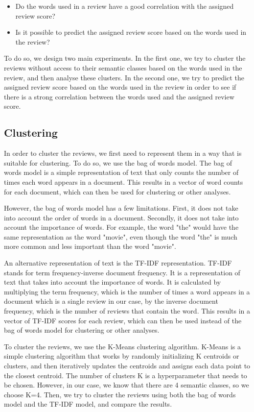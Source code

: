 \documentclass[12pt]{article}    %
\begin{document}
\begin{itemize}
    \item Do the words used in a review have a good correlation with the assigned review score?
    \item Is it possible to predict the assigned review score based on the words used in the review?
\end{itemize}

To do so, we design two main experiments. In the first one, we try to cluster the reviews without access to their semantic classes based on the words used in the review, and then analyse these clusters. In the second one, we try to predict the assigned review score based on the words used in the review in order to see if there is a strong correlation between the words used and the assigned review score.

\subsection{Clustering}

In order to cluster the reviews, we first need to represent them in a way that is suitable for clustering. To do so, we use the bag of words model. The bag of words model is a simple representation of text that only counts the number of times each word appears in a document. This results in a vector of word counts for each document, which can then be used for clustering or other analyses.

However, the bag of words model has a few limitations. First, it does not take into account the order of words in a document. Secondly, it does not take into account the importance of words. For example, the word "the" would have the same representation as the word "movie", even though the word "the" is much more common and less important than the word "movie". 

An alternative representation of text is the TF-IDF representation. TF-IDF stands for term frequency-inverse document frequency. It is a representation of text that takes into account the importance of words. It is calculated by multiplying the term frequency, which is the number of times a word appears in a document which is a single review in our case, by the inverse document frequency, which is the number of reviews that contain the word. This results in a vector of TF-IDF scores for each review, which can then be used instead of the bag of words model for clustering or other analyses.


To cluster the reviews, we use the K-Means clustering algorithm. K-Means is a simple clustering algorithm that works by randomly initializing K centroids or clusters, and then iteratively updates the centroids and assigns each data point to the closest centroid. The number of clusters K is a hyperparameter that needs to be chosen. However, in our case, we know that there are 4 semantic classes, so we choose K=4. Then, we try to cluster the reviews using both the bag of words model and the TF-IDF model, and compare the results.
\end{document}
